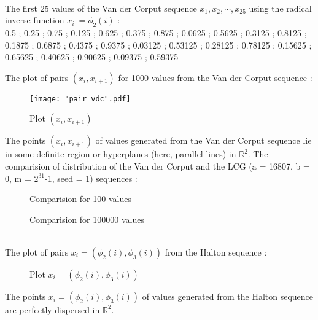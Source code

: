 \documentclass[11pt]{article}
\begin{document}
\newpage
{}\\
The first 25 values of the Van der Corput sequence $x_1, x_2, \cdots, x_{25}$ using the radical inverse function $x_i \:= \phi_{2}(i)$ :\\
0.5 ; 0.25 ; 0.75 ; 0.125 ; 0.625 ; 0.375 ; 0.875 ; 0.0625 ; 0.5625 ; 0.3125 ; 0.8125 ; 0.1875 ; 0.6875 ; 0.4375 ; 0.9375 ; 0.03125 ; 0.53125 ; 0.28125 ; 0.78125 ; 0.15625 ; 0.65625 ; 0.40625 ; 0.90625 ; 0.09375 ; 0.59375

The plot of pairs $(x_i, x_{i+1})$ for 1000 values from the Van der Corput sequence :
\begin{figure}[H]
	\centering
	\texttt{[image: "pair\_vdc".pdf]}
		\caption{Plot $(x_i, x_{i+1})$}
\end{figure}

The points $(x_i, x_{i+1})$ of values generated from the Van der Corput sequence lie in some definite region or hyperplanes (here, parallel lines) in $\mathbb{R}^2$.
\newpage
The comparision of distribution of the Van der Corput and the LCG (a = 16807, b = 0, m = $2^{31}$-1, seed = 1) sequences :
\begin{figure}[H]
	\centering
		\caption{Comparision for 100 values}
\end{figure}
\begin{figure}[H]
	\centering
		\caption{Comparision for 100000 values}
\end{figure}
\newpage
{}\\
The plot of pairs $x_i = (\phi_{2}(i), \phi_{3}(i))$ from the Halton sequence :
\begin{figure}[H]
	\centering
		\caption{Plot $x_i = (\phi_{2}(i), \phi_{3}(i))$}
\end{figure}

The points $x_i = (\phi_{2}(i), \phi_{3}(i))$ of values generated from the Halton sequence are perfectly dispersed in $\mathbb{R}^2$.
\end{document}
